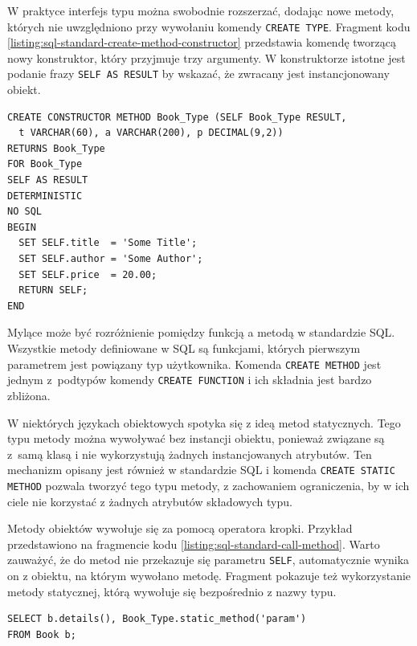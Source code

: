 \documentclass[a4paper,twoside,12pt]{book}
\begin{document}
W praktyce interfejs typu można swobodnie rozszerzać, dodając nowe metody, których nie uwzględniono przy wywołaniu komendy \lstinline{CREATE TYPE}. Fragment kodu \ref{listing:sql-standard-create-method-constructor} przedstawia komendę tworzącą nowy konstruktor, który przyjmuje trzy argumenty. W konstruktorze istotne jest podanie frazy \lstinline{SELF AS RESULT} by wskazać, że zwracany jest instancjonowany obiekt.

\begin{lstlisting}[style=SQL, caption={Stworzenie nowego konstruktora według standardu SQL.}, label={listing:sql-standard-create-method-constructor}, captionpos=b]
CREATE CONSTRUCTOR METHOD Book_Type (SELF Book_Type RESULT, 
  t VARCHAR(60), a VARCHAR(200), p DECIMAL(9,2))
RETURNS Book_Type
FOR Book_Type
SELF AS RESULT
DETERMINISTIC
NO SQL
BEGIN
  SET SELF.title  = 'Some Title';
  SET SELF.author = 'Some Author';      
  SET SELF.price  = 20.00;
  RETURN SELF;
END
\end{lstlisting}

Mylące może być rozróżnienie pomiędzy funkcją a metodą w standardzie SQL. Wszystkie metody definiowane w SQL są funkcjami, których pierwszym parametrem jest powiązany typ użytkownika. Komenda \lstinline{CREATE METHOD} jest jednym z~podtypów komendy \lstinline{CREATE FUNCTION} i ich składnia jest bardzo zbliżona.

W niektórych językach obiektowych spotyka się z ideą metod statycznych. Tego typu metody można wywoływać bez instancji obiektu, ponieważ związane są z~samą klasą i nie wykorzystują żadnych instancjowanych atrybutów. Ten mechanizm opisany jest również w standardzie SQL i komenda \lstinline{CREATE STATIC METHOD} pozwala tworzyć tego typu metody, z zachowaniem ograniczenia, by w ich ciele nie korzystać z żadnych atrybutów składowych typu.

Metody obiektów wywołuje się za pomocą operatora kropki. Przykład przedstawiono na fragmencie kodu \ref{listing:sql-standard-call-method}. Warto zauważyć, że do metod nie przekazuje się parametru \lstinline{SELF}, automatycznie wynika on z obiektu, na którym wywołano metodę. Fragment pokazuje też wykorzystanie metody statycznej, którą wywołuje się bezpośrednio z nazwy typu. 

\vspace{0.35cm}

\begin{lstlisting}[style=SQL, caption={Wywołanie metody obiektu i metody statycznej według standardu SQL.}, label={listing:sql-standard-call-method}, captionpos=b]
SELECT b.details(), Book_Type.static_method('param')
FROM Book b;
\end{lstlisting}
\end{document}
